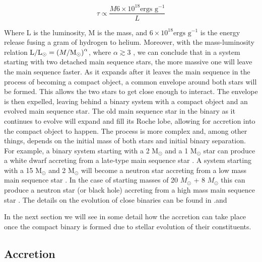 \begin{equation}
        \tau \propto \frac{ M 6 \times 10^{18} \text{ergs g}^{-1}}{L}
\end{equation}

Where L is the luminosity, M is the mass,  and $6\times 10^{18} \text{ergs g}^{-1}$ is the energy release fusing a gram of hydrogen to helium. Moreover, with the mass-luminosity relation $ \text L / \text L _\odot = \left  (M / \text M _\odot \right )^\alpha $, where $\alpha \gtrsim 3$ \citep[e.g.][]{de2008stars}, we can conclude that in a system starting with two detached main sequence stars, the more massive one will leave the main sequence faster. As it expands after it leaves the main sequence in the process of becoming a compact object, a common envelope around both stars will be formed. This allows the two stars to get close enough to interact. The envelope is then expelled, leaving behind a binary system with a compact object and an evolved main sequence star. The old main sequence star in the binary as it continues to evolve will expand and fill its Roche lobe, allowing for accretion into the compact object to happen.  The process is more complex and, among other things, depends on the initial mass of both stars and initial binary separation. For example, a binary system starting with a 2 M$_\odot$  and  a 1 M$_\odot$ star can produce a white dwarf accreting from a late-type main sequence star \citep{kippenhahn_entwicklung_1967,de_loore_structure_1992}. A system starting with a 15 M$_\odot$ and 2 M$_\odot$ will become a neutron star accreting from a low mass main sequence star \citep{heuvel_late_1976}. In the case of starting masses of 20 $M_\odot$ + 8 $M_\odot$ this can produce a neutron star (or black hole) accreting from a high mass main sequence star \citep{heuvel_late_1976}. The details on the evolution of close binaries can be found in \cite{postnov_evolution_2014}.and \citep{de2008stars}


In the next section we will see in some detail how the accretion can take place once the compact binary is formed due to stellar evolution of their constituents. 

\subsection{Accretion}

